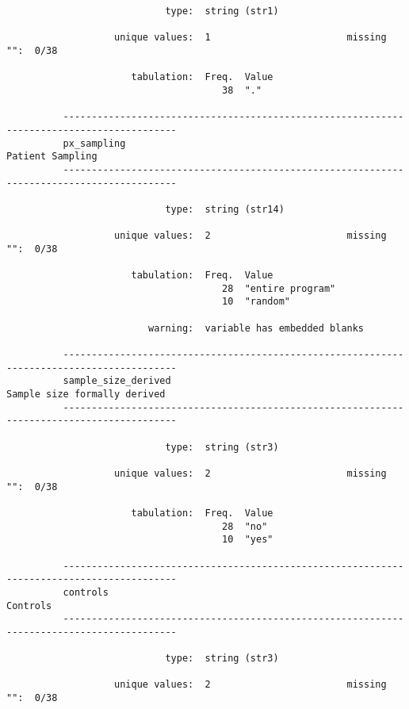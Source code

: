 \documentclass{article}
\begin{document}
\begin{verbatim}
                            type:  string (str1)
          
                   unique values:  1                        missing "":  0/38
          
                      tabulation:  Freq.  Value
                                      38  "."
          
          ------------------------------------------------------------------------------------------
          px_sampling                                                               Patient Sampling
          ------------------------------------------------------------------------------------------
          
                            type:  string (str14)
          
                   unique values:  2                        missing "":  0/38
          
                      tabulation:  Freq.  Value
                                      28  "entire program"
                                      10  "random"
          
                         warning:  variable has embedded blanks
          
          ------------------------------------------------------------------------------------------
          sample_size_derived                                           Sample size formally derived
          ------------------------------------------------------------------------------------------
          
                            type:  string (str3)
          
                   unique values:  2                        missing "":  0/38
          
                      tabulation:  Freq.  Value
                                      28  "no"
                                      10  "yes"
          
          ------------------------------------------------------------------------------------------
          controls                                                                          Controls
          ------------------------------------------------------------------------------------------
          
                            type:  string (str3)
          
                   unique values:  2                        missing "":  0/38
          

\end{verbatim}
\end{document}

